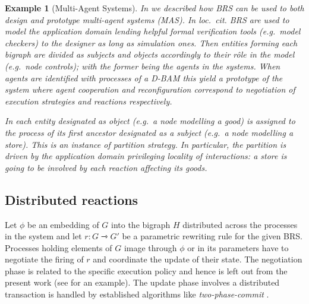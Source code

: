 \documentclass[a4paper,english,10pt]{article}
\theoremstyle{plain}\newtheorem{theorem}{Theorem}
\theoremstyle{plain}\newtheorem{corollary}[theorem]{Corollary}
\theoremstyle{plain}\newtheorem{proposition}[theorem]{Proposition}
\theoremstyle{plain}\newtheorem{lemma}[theorem]{Lemma}
\theoremstyle{plain}\newtheorem{definition}{Definition}
\theoremstyle{plain}\newtheorem{remark}{Remark}
\theoremstyle{plain}\newtheorem{example}[remark]{Example}
\newcommand{\?}[1]{}
\begin{document}
\begin{example}[Multi-Agent Systems]
	In \cite{mmp:dais14} we described how BRS can be used to both design
	and prototype multi-agent systems (MAS). In loc.~cit. BRS are used 
	to model the application domain lending helpful formal 	verification 
	tools (e.g.~model checkers) to the designer as long as simulation 
	ones. Then entities forming each bigraph are divided as \emph{subjects} and 
	\emph{objects} accordingly to their r\^ole in the model (e.g.~node controls);
	with the former	being the agents in the systems. When agents are identified
	with processes of a D-BAM this yield a prototype of the system where agent
	cooperation and reconfiguration correspond to negotiation of execution
	strategies and reactions respectively.
	
	In \cite{mmp:dais14} each entity designated as object 
	(e.g.~a node modelling a good) is assigned to the process of its first 
	ancestor designated as a subject (e.g.~a node modelling a store). 
	This is an instance of \emph{partition strategy}.
	In particular, the partition is driven by the application domain privileging
	locality of interactions: a store is going to be involved by each reaction affecting its goods.
\end{example}

\subsection{Distributed reactions}
\label{sec:dreac}
Let $\phi$ be an embedding of $G$ into the bigraph $H$ distributed across
the processes in the system and let $r: G \rightarrowtriangle G'$ 
be a parametric rewriting rule for the given BRS. 
Processes holding elements of $G$ image through $\phi$ 
or in its parameters have to negotiate the firing of $r$ 
and coordinate the update of their state. The negotiation
phase is related to the specific execution policy and hence
is left out from the present work (see \cite{mmp:dais14,perrone:thesis} for
an example). The update phase involves a distributed
transaction is handled by established algorithms
like \emph{two-phase-commit} \cite{cooper1982:distcommit}.
\end{document}
